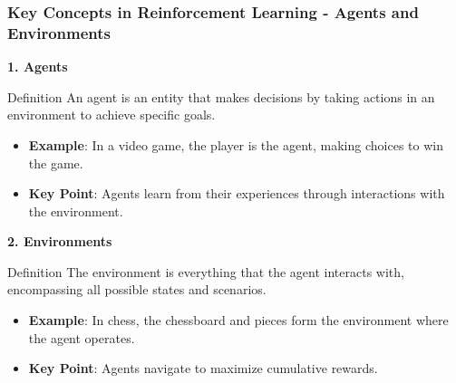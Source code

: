 \documentclass[aspectratio=169]{beamer}
\begin{document}
\begin{frame}[fragile]
  \frametitle{Key Concepts in Reinforcement Learning - Agents and Environments}
  \textbf{1. Agents}
  \begin{block}{Definition}
    An agent is an entity that makes decisions by taking actions in an environment to achieve specific goals.
  \end{block}
  \begin{itemize}
    \item \textbf{Example}: In a video game, the player is the agent, making choices to win the game.
    \item \textbf{Key Point}: Agents learn from their experiences through interactions with the environment.
  \end{itemize}

  \textbf{2. Environments}
  \begin{block}{Definition}
    The environment is everything that the agent interacts with, encompassing all possible states and scenarios.
  \end{block}
  \begin{itemize}
    \item \textbf{Example}: In chess, the chessboard and pieces form the environment where the agent operates.
    \item \textbf{Key Point}: Agents navigate to maximize cumulative rewards.
  \end{itemize}
\end{frame}
\end{document}
